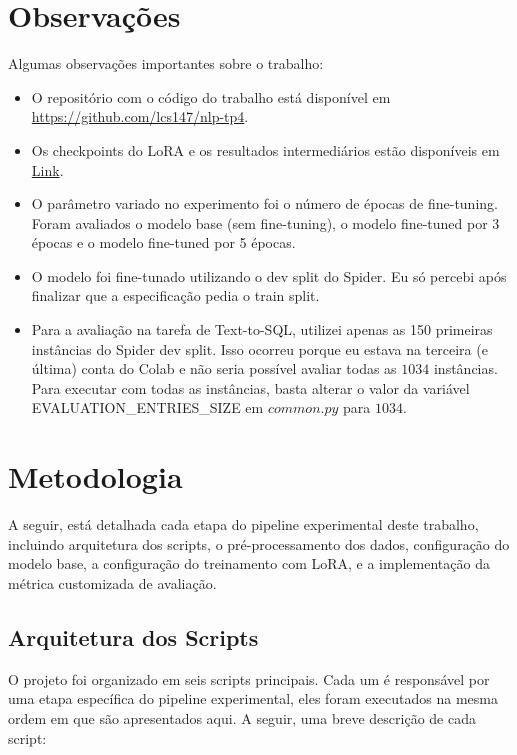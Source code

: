 \documentclass[journal,onecolumn]{IEEEtran}
\begin{document}
\section{Observações}
Algumas observações importantes sobre o trabalho:
\begin{itemize}
    \item O repositório com o código do trabalho está disponível em \url{https://github.com/lcs147/nlp-tp4}.
    \item Os checkpoints do LoRA e os resultados intermediários estão disponíveis em \href{https://drive.google.com/drive/folders/1VXzIdSLtCn5-leHEG6usvXw60Y5OzKKv?usp=sharing}{Link}.
    \item O parâmetro variado no experimento foi o número de épocas de fine-tuning. Foram avaliados o modelo base (sem fine-tuning), o modelo fine-tuned por 3 épocas e o modelo fine-tuned por 5 épocas.
    \item O modelo foi fine-tunado utilizando o dev split do Spider. Eu só percebi após finalizar que a especificação pedia o train split.
    \item Para a avaliação na tarefa de Text-to-SQL, utilizei apenas as 150 primeiras instâncias do Spider dev split. Isso ocorreu porque eu estava na terceira (e última) conta do Colab e não seria possível avaliar todas as $1034$ instâncias. Para executar com todas as instâncias, basta alterar o valor da variável EVALUATION\_ENTRIES\_SIZE em $common.py$ para $1034$.
\end{itemize}

\section{Metodologia}
 A seguir, está detalhada cada etapa do pipeline experimental deste trabalho, incluindo arquitetura dos scripts, o pré-processamento dos dados, configuração do modelo base, a configuração do treinamento com LoRA, e a implementação da métrica customizada de avaliação.

\subsection{Arquitetura dos Scripts}

O projeto foi organizado em seis scripts principais. Cada um é responsável por uma etapa específica do pipeline experimental, eles foram executados na mesma ordem em que são apresentados aqui. A seguir, uma breve descrição de cada script:
\end{document}
